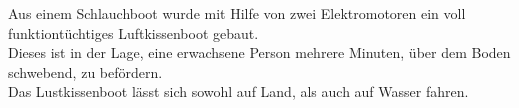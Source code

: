 
Aus einem Schlauchboot wurde mit Hilfe von zwei Elektromotoren ein voll funktiontüchtiges Luftkissenboot gebaut. \\
Dieses ist in der Lage, eine erwachsene Person mehrere Minuten, über dem Boden schwebend, zu befördern. \\
Das Lustkissenboot lässt sich sowohl auf Land, als auch auf Wasser fahren. \\
